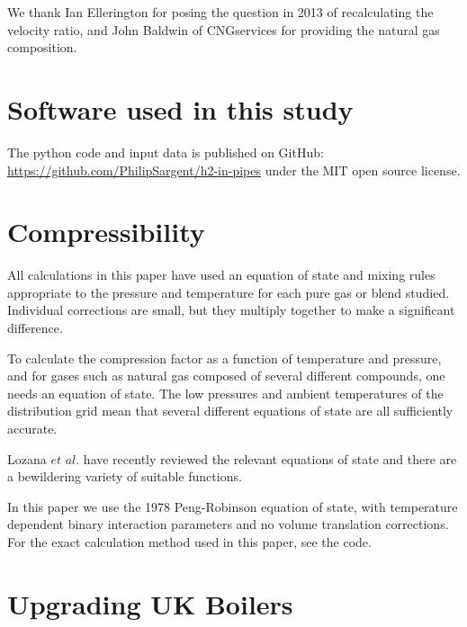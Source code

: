 \documentclass[5p]{elsarticle} %
\begin{document}
We thank Ian Ellerington for posing the question in 2013 of recalculating the velocity ratio, and John Baldwin of CNGservices for providing the natural gas composition.

\appendix

\section{Software used in this study}
\label{sec:oursoftware}
The python code and input data is published on GitHub: \url{https://github.com/PhilipSargent/h2-in-pipes} under the MIT open source license\citep{Sargents_github}.

\section{Compressibility}
\label{appendix:gasprops}
All calculations in this paper have used an equation of state and  mixing rules appropriate to the pressure and temperature for each pure gas or blend studied. Individual corrections are small, but they multiply together to make a significant difference.

To calculate the compression factor as a function of temperature and pressure, and for gases such as natural gas composed of several different compounds, one needs an equation of state.
The low pressures and ambient temperatures of the distribution grid mean that several different equations of state are all sufficiently accurate.

Lozana $et$ $al.$ have recently reviewed\citep{Lozana2022}  the relevant equations of state and there are a bewildering variety of suitable functions.

\label{sec:eqnofstate}
 In this paper we use the 1978 Peng-Robinson equation of state\citep{Tabkhi2008, Abbas2021}, with temperature dependent binary interaction parameters and no volume translation corrections.
 For the exact calculation method used in this paper, see 
 the code\citep{Sargents_github}. 



\section{Upgrading UK Boilers}
\label{appendix:more-boilers}
\label{appendix:h2upgrade}
\end{document}
